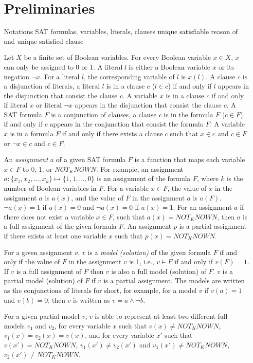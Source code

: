 \section{Preliminaries} \label{sec:prel}
Notations
SAT formulas, variables, literals, clauses
unique satisfiable reason of and unique satisfied clause

Let $X$ be a finite set of Boolean variables. For every Boolean variable $x\in X$, $x$ can only be assigned to 0 or 1.
A literal $l$ is either a Boolean variable $x$ or its negation $\neg x$. For a literal $l$, the corresponding variable of $l$ is $x(l)$.
A clause $c$ is a disjunction of literals, a literal $l$ is in a clause $c$ ($l\in c$) if and only if $l$ appears in the disjunction that consist the clause $c$. A variable $x$ is in a clause $c$ if and only if literal $x$ or literal $\neg x$ appears in the disjunction that consist the clause $c$. 
A SAT formula $F$ is a conjunction of clauses, a clause $c$ is in the formula $F$ ($c\in F$) if and only if $c$ appears in the conjunction that consist the formula $F$. A variable $x$ is in a formula $F$ if and only if there exists a clause $c$ such that $x\in c$ and $c\in F$ or $\neg x\in c$ and $c\in F$. 

An \emph{assignment} $a$ of a given SAT formula $F$ is a function that maps each variable $x\in F$ to 0, 1, or $NOT_KNOWN$. 
For example, an assignment $a: \{x_1, x_2, ..., x_k\} \mapsto \{1, 1, ..., 0\}$ is an assignment of the formula $F$, where $k$ is the number of Boolean variables in $F$. 
For a variable $x\in F$, the value of $x$ in the assignment $a$ is $a(x)$, and the value of $F$ in the assignment $a$ is $a(F)$.
$\neg a(x)=1$ if $a(x)=0$ and $\neg a(x)=0$ if $a(x)=1$.
For an assignment $a$ if there does not exist a variable $x\in F$, such that $a(x)=NOT_KNOWN$, then $a$ is a full assignment of the given formula $F$. 
An assignment $p$ is a partial assignment if there exists at least one variable $x$ such that $p(x)=NOT_KNOWN$.

For a given assignment $v$, $v$ is a \emph{model (solution)} of the given formula $F$ if and only if the value of $F$ in the assignment $v$ is 1, i.e., $v\models F$ if and only if $v(F)=1$. If $v$ is a full assignment of $F$ then $v$ is also a full model (solution) of $F$. $v$ is a partial model (solution) of $F$ if $v$ is a partial assignment.
The models are written as the conjunctions of literals for short, for example, for a model $v$ if $v(a)=1$ and $v(b)=0$, then $v$ is written as $v=a\wedge \neg b$.

For a given partial model $v$, $v$ is able to represent at least two different full models $v_1$ and $v_2$, for every variable $x$ such that $v(x)\neq NOT_KNOWN$, $v_1(x)=v_2(x)=v(x)$, and for every variable $x'$ such that $v(x')=NOT_KNOWN$, $v_1(x')\neq v_2(x')$ and $v_1(x')\neq NOT_KNOWN$, $v_2(x')\neq NOT_KNOWN$.

